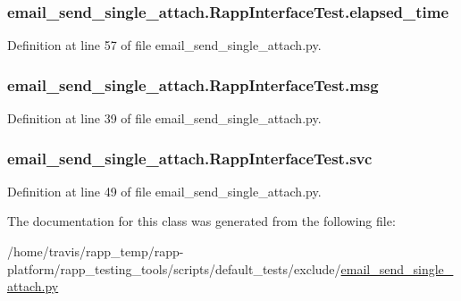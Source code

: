 \hypertarget{classemail__send__single__attach_1_1RappInterfaceTest_aa983be0a2cb68dd849f548c384614977}{
\subsubsection[{elapsed\-\_\-time}]{\setlength{\rightskip}{0pt plus 5cm}email\-\_\-send\-\_\-single\-\_\-attach.\-Rapp\-Interface\-Test.\-elapsed\-\_\-time}}\label{classemail__send__single__attach_1_1RappInterfaceTest_aa983be0a2cb68dd849f548c384614977}


Definition at line 57 of file email\-\_\-send\-\_\-single\-\_\-attach.\-py.

\hypertarget{classemail__send__single__attach_1_1RappInterfaceTest_adbb86d65e74f90fbfbc38f9dadc3be4c}{
\subsubsection[{msg}]{\setlength{\rightskip}{0pt plus 5cm}email\-\_\-send\-\_\-single\-\_\-attach.\-Rapp\-Interface\-Test.\-msg}}\label{classemail__send__single__attach_1_1RappInterfaceTest_adbb86d65e74f90fbfbc38f9dadc3be4c}


Definition at line 39 of file email\-\_\-send\-\_\-single\-\_\-attach.\-py.

\hypertarget{classemail__send__single__attach_1_1RappInterfaceTest_a4cde5bd7f40144979c8606428c6b0ec1}{
\subsubsection[{svc}]{\setlength{\rightskip}{0pt plus 5cm}email\-\_\-send\-\_\-single\-\_\-attach.\-Rapp\-Interface\-Test.\-svc}}\label{classemail__send__single__attach_1_1RappInterfaceTest_a4cde5bd7f40144979c8606428c6b0ec1}


Definition at line 49 of file email\-\_\-send\-\_\-single\-\_\-attach.\-py.



The documentation for this class was generated from the following file\-:\begin{DoxyCompactItemize}
\item 
/home/travis/rapp\-\_\-temp/rapp-\/platform/rapp\-\_\-testing\-\_\-tools/scripts/default\-\_\-tests/exclude/\hyperlink{email__send__single__attach_8py}{email\-\_\-send\-\_\-single\-\_\-attach.\-py}\end{DoxyCompactItemize}
